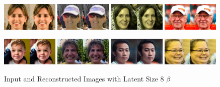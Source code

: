 \documentclass[11pt]{article}
\numberwithin{equation}{section}
\begin{document}
\begin{figure}[h]
  \caption{Input and Reconstructed Images with Latent Size 8 $\beta$}
  \label{fig:samples}
  \centering
  \includegraphics[width=0.24\textwidth]{LatentDiffusion/vae-samples/vae8/sample_0_0.png}%
  \hfill
  \includegraphics[width=0.24\textwidth]{LatentDiffusion/vae-samples/vae8/sample_0_1.png}%
  \hfill
  \includegraphics[width=0.24\textwidth]{LatentDiffusion/vae-samples/vae8/sample_0_2.png}%
  \hfill
  \includegraphics[width=0.24\textwidth]{LatentDiffusion/vae-samples/vae8/sample_0_3.png}
	
	\includegraphics[width=0.24\textwidth]{LatentDiffusion/vae-samples/vae8/sample_0_4.png}%
  \hfill
  \includegraphics[width=0.24\textwidth]{LatentDiffusion/vae-samples/vae8/sample_0_5.png}%
  \hfill
  \includegraphics[width=0.24\textwidth]{LatentDiffusion/vae-samples/vae8/sample_0_6.png}%
  \hfill
  \includegraphics[width=0.24\textwidth]{LatentDiffusion/vae-samples/vae8/sample_0_7.png}
\end{figure}
\end{document}

